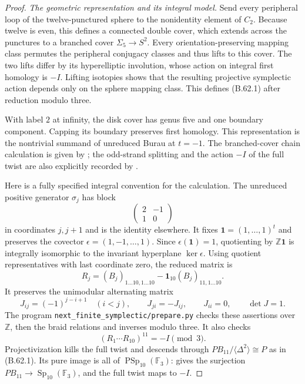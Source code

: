 \begin{proof}
\emph{The geometric representation and its integral model.}
Send every peripheral loop of the twelve-punctured sphere
to the nonidentity element of $C_2$.
Because twelve is even, this defines a connected double
cover, which extends across the punctures to a branched
cover $\Sigma_5\to S^2$.
Every orientation-preserving mapping class permutes the
peripheral conjugacy classes and thus lifts to this cover.
The two lifts differ by its hyperelliptic involution, whose
action on integral first homology is $-I$.
Lifting isotopies shows that the resulting projective
symplectic action depends only on the sphere mapping
class.  This defines (B.62.1) after reduction modulo three.

With label $2$ at infinity, the disk cover has genus five
and one boundary component.  Capping its boundary preserves
first homology.  This representation is the nontrivial
summand of unreduced Burau at $t=-1$.
The branched-cover chain calculation is given by
\citet[Sections 2.2--2.3, Proposition 2.1]{DE_GambaudoGhys2005};
the odd-strand splitting and the action $-I$ of the full
twist are also explicitly recorded by
\citet[Introduction, ``Hyperelliptic Torelli vs Burau'']
{DE_BrendleMargalitPutman2015}.

Here is a fully specified integral convention for the
calculation.  The unreduced positive generator $\sigma_j$
has block
\[
              \begin{pmatrix}2&-1\\1&0\end{pmatrix}
\]
in coordinates $j,j+1$ and is the identity elsewhere.
It fixes $\mathbf 1=(1,\ldots,1)^t$ and preserves the
covector $\epsilon=(1,-1,\ldots,1)$.
Since $\epsilon(\mathbf1)=1$, quotienting by
$\mathbb Z\mathbf1$ is integrally isomorphic to the
invariant hyperplane $\ker\epsilon$.
Using quotient representatives with last coordinate zero,
the reduced matrix is
\[
        R_j=(B_j)_{1\ldots10,1\ldots10}
                    -\mathbf1_{10}(B_j)_{11,1\ldots10}.
                                                               \tag{B.62.4}
\]
It preserves the unimodular alternating matrix
\[
 J_{ij}=(-1)^{j-i+1}\quad(i<j),\qquad
 J_{ji}=-J_{ij},\qquad J_{ii}=0,
 \qquad \det J=1.                                           \tag{B.62.5}
\]
The program \nolinkurl{next_finite_symplectic/prepare.py}
checks these assertions over $\mathbb Z$, then the braid
relations and inverses modulo three.  It also checks
\[
       (R_1\cdots R_{10})^{11}=-I\pmod3.
\]
Projectivization kills the full twist and descends through
$PB_{11}/\langle\Delta^2\rangle\cong P$
as in (B.62.1).  Its pure image is all of
$\operatorname{PSp}_{10}(\mathbb F_3)$:
\citet[Theorem 5.1, with $g=5$, $b=1$, $m=6$]
{DE_Stylianakis2018} gives the surjection
$PB_{11}\to\operatorname{Sp}_{10}(\mathbb F_3)$,
and the full twist maps to $-I$.


\end{proof}
